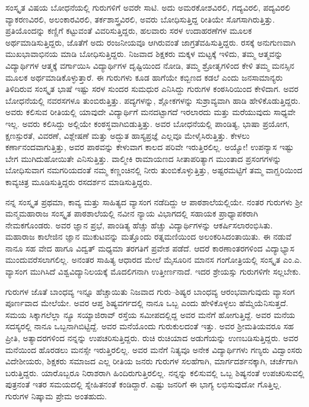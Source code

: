 ಸಂಸ್ಕೃತ ವಿಷಯ ಬೋಧನೆಯಲ್ಲಿ ಗುರುಗಳಿಗೆ ಅವರೇ ಸಾಟಿ. ಅದು ಅಮರಕೋಶವಿರಲಿ, ಗದ್ಯವಿರಲಿ, ಪದ್ಯವಿರಲಿ ವ್ಯಾಕರಣವಿರಲಿ, ಅಲಂಕಾರವಿರಲಿ, ತರ್ಕಶಾಸ್ತ್ರವಿರಲಿ, ಅವರು ಬೋಧಿಸುತ್ತಿದ್ದ ರೀತಿಯೇ ಸೊಗಸಾಗಿರುತ್ತಿತ್ತು. ಪ್ರತಿಯೊಂದನ್ನು ಕಣ್ಣಿಗೆ ಕಟ್ಟುವಂತೆ ವಿವರಿಸುತ್ತಿದ್ದರು, ಹಲವಾರು ಸರಳ ಉದಾಹರಣೆಗಳ ಮೂಲಕ ಅರ್ಥಮಾಡಿಸುತ್ತಿದ್ದರು, ಜೊತೆಗೆ ಅದು ರಂಜನೀಯವೂ ಆಗಿರುವಂತೆ ಜಾಗ್ರತೆವಹಿಸುತ್ತಿದ್ದರು. ರಸಕ್ಕೆ ಅನುಗುಣವಾಗಿ ಮುಖಭಾವಾಭಿನಯ ಮಾಡಿ ಬೋಧಿಸುತ್ತಿದ್ದರು. ನಿಜವಾದ ಶಿಕ್ಷಕರು ಮಕ್ಕಳ ಮಟ್ಟಕ್ಕೆ ಇಳಿದು, ತಮ್ಮ ಆತ್ಮವನ್ನು ವಿದ್ಯಾರ್ಥಿಗಳ ಆತ್ಮಕ್ಕೆ ವರ್ಗಾಯಿಸಿ ವಿದ್ಯಾರ್ಥಿಗಳ ದೃಷ್ಟಿಯಿಂದ ನೋಡಿ, ತಮ್ಮ ಶ್ರೋತೃಗಳಿಂದ ಕೇಳಿ ತಮ್ಮ ಮನಸ್ಸಿನ ಮೂಲಕ ಅರ್ಥಮಾಡಿಕೊಳ್ಳುತ್ತಾರೆ. ಈ ಗುರುಗಳು ಕೂಡ ಹಾಗೆಯೇ ಕಬ್ಬಿಣದ ಕಡಲೆ ಎಂದು ಜನಸಾಮಾನ್ಯರು ತಿಳಿದಿರುವ ಸಂಸ್ಕೃತ ಭಾಷೆ ಇಷ್ಟು ಸರಳ ಸುಂದರ ಸುಮಧುರ ಎನಿಸಿದ್ದು ಗುರುಗಳ ಕಂಠಸಿರಿಯಿಂದ ಕೇಳಿದಾಗ. ಅವರ ಬೋಧನೆಯಲ್ಲಿ ನವರಸಗಳೂ ತುಂಬಿರುತ್ತಿತ್ತು. ಪದ್ಯಗಳನ್ನು, ಶ್ಲೋಕಗಳನ್ನು ಸುಶ್ರಾವ್ಯವಾಗಿ ಹಾಡಿ ಹೇಳಿಕೊಡುತ್ತಿದ್ದರು. ಅವರು ಕಲಿಸುವ ರೀತಿಯಲ್ಲಿ ಯಾವುದೇ ವಿದ್ಯಾರ್ಥಿಗೆ ಮನದಟ್ಟಾಗದೆ ಇರಲಾರದು ಮತ್ತು ಮರೆಯುವುದು ಸಾಧ್ಯವೇ ಇಲ್ಲ. ಅವರು ಕಲಿಸಿದ್ದು ಅಲ್ಲಿಯೇ ಕಂಠಸ್ಥವಾಗಿಬಿಡುತ್ತಿತ್ತು. ಅವರ ಬೋಧನೆಯಲ್ಲಿ ಪಾಂಡಿತ್ಯ, ಭಾಷಾ ಪ್ರಯೋಗ, ಕ್ಷಣಸ್ಪುರತೆ, ವಿವರಣೆ, ವಿಶ್ಲೇಷಣೆ ಮತ್ತು ಅದ್ಭುತ ಹಾಸ್ಯಪ್ರಜ್ಞೆ ಎಲ್ಲವೂ ಮೇಳೈಸಿರುತ್ತಿತ್ತು. ಕೇಳಲು ಕರ್ಣಾನಂದವಾಗುತ್ತಿತ್ತು, ಅವರ ಪಾಠವನ್ನು ಕೇಳುವಾಗ ಕಾಲದ ಪರಿವೇ ಇರುತ್ತಿರಲಿಲ್ಲ. ಅಯ್ಯೋ! ಉಪನ್ಯಾಸ ಇಷ್ಟು ಬೇಗ ಮುಗಿದುಹೋಯಿತೇ ಎನಿಸುತ್ತಿತ್ತು. ವಾಲ್ಮೀಕಿ ರಾಮಾಯಣದ ಸೀತಾಪರಿತ್ಯಾಗ ಮುಂತಾದ ಪ್ರಸಂಗಗಳನ್ನು ಬೋಧಿಸುವಾಗ ನಮಗರಿಯದಂತೆ ನಮ್ಮ ಕಣ್ಣಂಚಿನಲ್ಲಿ ನೀರು ತುಂಬಿಕೊಳ್ಳುತ್ತಿತ್ತು, ಅಷ್ಟರಮಟ್ಟಿಗೆ ತಮ್ಮ ವಾಗ್ಝರಿಯಿಂದ ಕಾವ್ಯಚಿತ್ರ ಮೂಡಿಸುತ್ತಿದ್ದರು ರಸದರ್ಶನ ಮಾಡಿಸುತ್ತಿದ್ದರು.

ನನ್ನ ಸಂಸ್ಕೃತ ಪ್ರಥಮಾ, ಕಾವ್ಯ ಮತ್ತು ಸಾಹಿತ್ಯದ ವ್ಯಾಸಂಗ ನಡೆದಿದ್ದು ಆ ಪಾಠಶಾಲೆಯಲ್ಲಿಯೇ. ನಂತರ ಗುರುಗಳು ಶ್ರೀ ಮನ್ಮಮಹಾರಾಜ ಸಂಸ್ಕೃತ ಪಾಠಶಾಲೆಯಲ್ಲಿ ನವೀನ ನ್ಯಾಯ ವಿಭಾಗದಲ್ಲಿ ಸಹಾಯಕ ಪ್ರಾಧ್ಯಾಪಕರಾಗಿ ನೇಮಕಗೊಂಡರು. ಅವರ ಜ್ಞಾನ ಪ್ರಭೆ, ಪಾಂಡಿತ್ಯ ಹೆಚ್ಚು ಹೆಚ್ಚು ವಿದ್ಯಾರ್ಥಿಗಳನ್ನು ಆಕರ್ಷಿಸಲಾರಂಭಿಸಿತು. ಮಹಾರಾಜ ಕಾಲೇಜಿನ ಜ್ಞಾನ ಮುಕುಟವನ್ನು ಮತ್ತೊಂದು ರತ್ನಮಣಿಯಿಂದ ಅಲಂಕರಿಸಿದಂತಾಯಿತು. ಈ ನಡುವೆ ನಾನೂ ಸಹ ವೇದ ಹಾಗೂ ವಿದ್ವತ್ ಮಧ್ಯಮಾ ತರಗತಿಗೆ ಪ್ರವೇಶ ಪಡೆದೆ. ಆದರೆ ಕಾರಣಾಂತರಗಳಿಂದ ವಿದ್ಯಾಭ್ಯಾಸ ಮುಂದುವರೆಸಲಾಗಲಿಲ್ಲ. ಅನಂತರ ಸಾಹಿತ್ಯ ಆಧಾರದ ಮೇಲೆ ಮೈಸೂರಿನ ಮಾನಸ ಗಂಗೋತ್ರಿಯಲ್ಲಿ ಸಂಸ್ಕೃತ ಎಂ.ಎ. ವ್ಯಾಸಂಗ ಮುಗಿಸಿದೆ ವಿಶ್ವವಿದ್ಯಾನಿಲಯಕ್ಕೆ ಮೊದಲಿಗನಾಗಿ ಉತ್ತೀರ್ಣನಾದೆ. ಇದರ ಶ್ರೇಯಸ್ಸು ಗುರುಗಳಿಗೇ ಸಲ್ಲಬೇಕು.

ಗುರುಗಳ ಜೊತೆ ಬಾಂಧವ್ಯ ಇನ್ನೂ ಹೆಚ್ಚಾಯಿತು ನಿಜವಾದ ಗುರು–ಶಿಷ್ಯರ ಬಾಂಧವ್ಯ ಆರಂಭವಾಗುವುದು ವ್ಯಾಸಂಗ ಪೂರ್ಣವಾದ ಮೇಲೆಯೇ. ಅವರ ಆಪ್ತ ಶಿಷ್ಯವರ್ಗದಲ್ಲಿ ನಾನೂ ಒಬ್ಬ ಎಂದು ಹೇಳಿಕೊಳ್ಳಲು ಹೆಮ್ಮೆಯೆನಿಸುತ್ತದೆ. ಸಮಯ ಸಿಕ್ಕಾಗಲೆಲ್ಲಾ ನ್ಯೂ ಸಯ್ಯಾಜಿರಾವ್ ರಸ್ತೆಯ ಸಮೀಪದಲ್ಲಿದ್ದ ಅವರ ಮನೆಗೆ ಹೋಗುತ್ತಿದ್ದೆ. ಅವರ ಮನೆಯ ಸದಸ್ಯರಲ್ಲಿ ನಾನೂ ಒಬ್ಬನಾಗಿಬಿಟ್ಟಿದ್ದೆ. ಅವರ ಮನೆಯೊಂದು ಗುರುಕುಲದಂತೆ ಇತ್ತು. ಅವರ ಶ್ರೀಮತಿಯವರೂ ಸಹ ಪ್ರೀತಿ, ಅತ್ಯಾದರಗಳಿಂದ ನನ್ನನ್ನು ಉಪಚರಿಸುತ್ತಿದ್ದರು. ರುಚಿ ರುಚಿಯಾದ ಅಡುಗೆಯನ್ನು ಉಣಬಡಿಸುತ್ತಿದ್ದರು. ಅವರ ಮನೆಯಿಂದ ಹೊರಡಲು ಮನಸ್ಸೇ ಇರುತ್ತಿರಲಿಲ್ಲ. ಅವರ ಮನೆಗೆ ನಿತ್ಯವೂ ಅನೇಕ ವಿದ್ಯಾರ್ಥಿಗಳು ಗಣ್ಯರು ವಿದ್ವಾಂಸರು ವಿದೇಶೀಯರು, ಶಿಕ್ಷಕರು ಸಮಾಜದ ಎಲ್ಲ ರೀತಿಯ ಜನರು ಗುರುಗಳ ಸಲಹೆಗಾಗಿ, ಮಾರ್ಗದರ್ಶನಕ್ಕಾಗಿ, ಚರ್ಚೆಗಾಗಿ ಬರುತ್ತಿದ್ದರು. ಯಾರೊಬ್ಬರೂ ನಿರಾಶರಾಗಿ ಹಿಂದಿರುಗುತ್ತಿರಲಿಲ್ಲ. ನನ್ನನ್ನು ಕಲಿಸುವಲ್ಲಿ ಒಬ್ಬ ಶಿಷ್ಯನಂತೆ ಉಪಚರಿಸುವಲ್ಲಿ ಪುತ್ರನಂತೆ ಇತರ ಸಮಯದಲ್ಲಿ ಸ್ನೇಹಿತನಂತೆ ಕಂಡಿದ್ದಾರೆ. ಎಷ್ಟು ಜನರಿಗೆ ಈ ಭಾಗ್ಯ ಲಭಿಸುವುದೋ ಗೊತ್ತಿಲ್ಲ. ಗುರುಗಳ ನಿಷ್ಕಾಮ ಪ್ರೇಮ ಅಂತಹುದು.

